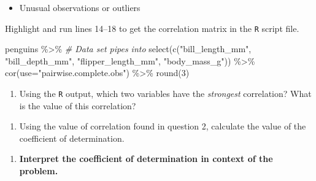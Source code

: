 \documentclass[
]{report}
\newenvironment{Shaded}{\begin{snugshade}}{\end{snugshade}}
\newcommand{\AttributeTok}[1]{\textcolor[rgb]{0.77,0.63,0.00}{#1}}
\newcommand{\CommentTok}[1]{\textcolor[rgb]{0.56,0.35,0.01}{\textit{#1}}}
\newcommand{\DecValTok}[1]{\textcolor[rgb]{0.00,0.00,0.81}{#1}}
\newcommand{\FunctionTok}[1]{\textcolor[rgb]{0.00,0.00,0.00}{#1}}
\newcommand{\NormalTok}[1]{#1}
\newcommand{\SpecialCharTok}[1]{\textcolor[rgb]{0.00,0.00,0.00}{#1}}
\newcommand{\StringTok}[1]{\textcolor[rgb]{0.31,0.60,0.02}{#1}}
\providecommand{\tightlist}{%
  \setlength{\itemsep}{0pt}\setlength{\parskip}{0pt}}
\begin{document}
\begin{itemize}
\tightlist
\item
  Unusual observations or outliers
\end{itemize}

\vspace{.15in}

Highlight and run lines 14--18 to get the correlation matrix in the \texttt{R} script file.

\begin{Shaded}
\begin{Highlighting}[]
\NormalTok{penguins }\SpecialCharTok{\%\textgreater{}\%}  \CommentTok{\# Data set pipes into}
  \FunctionTok{select}\NormalTok{(}\FunctionTok{c}\NormalTok{(}\StringTok{"bill\_length\_mm"}\NormalTok{, }\StringTok{"bill\_depth\_mm"}\NormalTok{, }
           \StringTok{"flipper\_length\_mm"}\NormalTok{, }\StringTok{"body\_mass\_g"}\NormalTok{)) }\SpecialCharTok{\%\textgreater{}\%}
  \FunctionTok{cor}\NormalTok{(}\AttributeTok{use=}\StringTok{"pairwise.complete.obs"}\NormalTok{) }\SpecialCharTok{\%\textgreater{}\%}
  \FunctionTok{round}\NormalTok{(}\DecValTok{3}\NormalTok{)}
\end{Highlighting}
\end{Shaded}

\begin{enumerate}
\def\labelenumi{\arabic{enumi}.}
\setcounter{enumi}{1}
\tightlist
\item
  Using the \texttt{R} output, which two variables have the \emph{strongest} correlation? What is the value of this correlation?
\end{enumerate}

\vspace{0.5in}

\begin{enumerate}
\def\labelenumi{\arabic{enumi}.}
\setcounter{enumi}{2}
\tightlist
\item
  Using the value of correlation found in question 2, calculate the value of the coefficient of determination.
\end{enumerate}

\vspace{0.5in}

\begin{enumerate}
\def\labelenumi{\arabic{enumi}.}
\setcounter{enumi}{3}
\tightlist
\item
  \textbf{Interpret the coefficient of determination in context of the problem.}
\end{enumerate}
\end{document}
